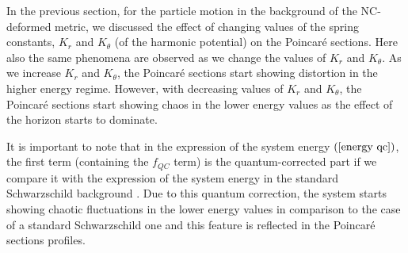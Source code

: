 \documentclass[aps,prd,showpacs,nofootinbib,floats,floatfix,preprintnumbers,groupedaddress,twocolumn]{revtex4-1}
\begin{document}
In the previous section, for  the particle motion in the background of the NC-deformed metric, we discussed the effect of changing values of the spring constants,  $K_r$ and $K_{\theta}$ (of the harmonic potential) on the Poincar\'e sections. Here also the same phenomena are observed as we change the values of $K_{r}$ and $K_{\theta}$. As we increase $K_r$ and $K_{\theta}$, the Poincar\'e sections start showing distortion in the higher energy regime. However, with  decreasing  values of $K_r$ and $K_{\theta}$, the Poincar\'e sections start showing chaos in the lower energy values as the effect of the horizon starts to dominate.
	
	
	
It is important to note that in the expression of the system energy $(\ref{energy qc})$, the first term  (containing the $f_{QC}$ term) is the quantum-corrected part if we compare it with the expression of the system energy in the standard Schwarzschild background \cite{Dalui:2018qqv}. Due to this quantum correction, the system starts showing chaotic fluctuations in the lower energy values in comparison to the case of a standard Schwarzschild one and this feature  is reflected in the  Poincar\'e sections profiles. 


\end{document}
